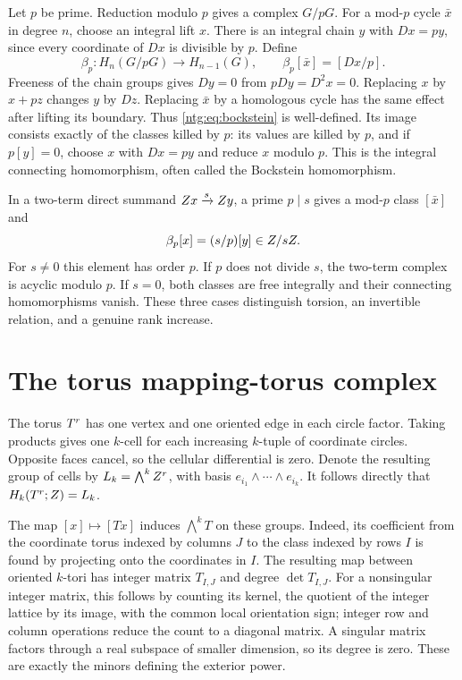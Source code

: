 Let $p$ be prime. Reduction modulo $p$ gives a complex $G/pG$.
For a mod-$p$ cycle $\bar x$ in degree $n$, choose an integral lift
$x$. There is an integral chain $y$ with $Dx=py$, since every
coordinate of $Dx$ is divisible by $p$. Define
\begin{equation}\label{ntg:eq:bockstein}
 \beta_p:H_n(G/pG)\longrightarrow H_{n-1}(G),\qquad
 \beta_p[\bar x]=[Dx/p].
\end{equation}
Freeness of the chain groups gives $Dy=0$ from $pDy=D^2x=0$.
Replacing $x$ by $x+pz$ changes $y$ by $Dz$. Replacing $\bar x$
by a homologous cycle has the same effect after lifting its boundary.
Thus \eqref{ntg:eq:bockstein} is well-defined. Its image consists exactly
of the classes killed by $p$: its values are killed by $p$, and if
$p[y]=0$, choose $x$ with $Dx=py$ and reduce $x$ modulo $p$.
This is the integral connecting homomorphism, often called the
Bockstein homomorphism.

In a two-term direct summand $Z x\xrightarrow{s}Z y$, a prime
$p\mid s$ gives a mod-$p$ class $[\bar x]$ and
\begin{equation}\label{ntg:eq:beta-factor}
 \beta_p[x]=(s/p)[y]\in Z/sZ.
\end{equation}
For $s\ne0$ this element has order $p$. If $p$ does not divide $s$,
the two-term complex is acyclic modulo $p$. If $s=0$, both classes
are free integrally and their connecting homomorphisms vanish. These
three cases distinguish torsion, an invertible relation, and a genuine
rank increase.

\section{The torus mapping-torus complex}\label{ntg:sec:torus}

The torus $T^r$ has one vertex and one oriented edge in each circle
factor. Taking products gives one $k$-cell for each increasing
$k$-tuple of coordinate circles. Opposite faces cancel, so the
cellular differential is zero. Denote the resulting group of cells by
$L_k=\bigwedge^kZ^r$, with basis
$e_{i_1}\wedge\cdots\wedge e_{i_k}$. It follows directly that
$H_k(T^r;Z)=L_k$.

The map $[x]\mapsto[Tx]$ induces $\bigwedge^kT$ on these groups.
Indeed, its coefficient from the coordinate torus indexed by columns
$J$ to the class indexed by rows $I$ is found by projecting onto the
coordinates in $I$. The resulting map between oriented $k$-tori has
integer matrix $T_{I,J}$ and degree $\det T_{I,J}$. For a nonsingular
integer matrix, this follows by counting its kernel, the quotient of
the integer lattice by its image, with the common local orientation
sign; integer row and column operations reduce the count to a
diagonal matrix. A singular matrix factors through a real subspace of
smaller dimension, so its degree is zero. These are exactly the
minors defining the exterior power.

